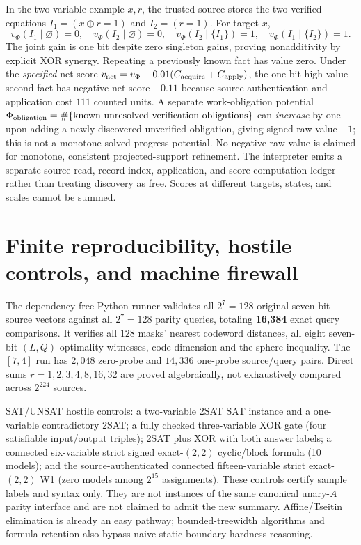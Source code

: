 \documentclass[10pt]{article}
\begin{document}
\noindent In the two-variable example $x,r$, the trusted source stores the two verified equations $I_1=(x\oplus r=1)$ and $I_2=(r=1)$. For target $x$,
\[
 v_\Phi(I_1\mid\varnothing)=0,\quad
 v_\Phi(I_2\mid\varnothing)=0,\quad
 v_\Phi(I_2\mid\{I_1\})=1,
 \quad v_\Phi(I_1\mid\{I_2\})=1.
\]
The joint gain is one bit despite zero singleton gains, proving nonadditivity by explicit XOR synergy. Repeating a previously known fact has value zero. Under the \emph{specified} net score $v_{\rm net}=v_\Phi-0.01(C_{\rm acquire}+C_{\rm apply})$, the one-bit high-value second fact has negative net score $-0.11$ because source authentication and application cost $111$ counted units. A separate work-obligation potential $\Phi_{\rm obligation}=\#\{\text{known unresolved verification obligations}\}$ can \emph{increase} by one upon adding a newly discovered unverified obligation, giving signed raw value $-1$; this is not a monotone solved-progress potential. No negative raw value is claimed for monotone, consistent projected-support refinement. The interpreter emits a separate source read, record-index, application, and score-computation ledger rather than treating discovery as free. Scores at different targets, states, and scales cannot be summed.

\section{Finite reproducibility, hostile controls, and machine firewall}
The dependency-free Python runner validates all $2^7=128$ original seven-bit source vectors against all $2^7=128$ parity queries, totaling \textbf{16,384} exact query comparisons. It verifies all $128$ masks' nearest codeword distances, all eight seven-bit $(L,Q)$ optimality witnesses, code dimension and the sphere inequality. The $[7,4]$ run has $2,048$ zero-probe and $14,336$ one-probe source/query pairs. Direct sums $r=1,2,3,4,8,16,32$ are proved algebraically, not exhaustively compared across $2^{224}$ sources.

\noindent SAT/UNSAT hostile controls: a two-variable 2SAT SAT instance and a one-variable contradictory 2SAT; a fully checked three-variable XOR gate (four satisfiable input/output triples); 2SAT plus XOR with both answer labels; a connected six-variable strict signed exact-$(2,2)$ cyclic/block formula (10 models); and the source-authenticated connected fifteen-variable strict exact-$(2,2)$ W1 (zero models among $2^{15}$ assignments). These controls certify sample labels and syntax only. They are not instances of the same canonical unary-$A$ parity interface and are not claimed to admit the new summary. Affine/Tseitin elimination is already an easy pathway; bounded-treewidth algorithms and formula retention also bypass naive static-boundary hardness reasoning.
\end{document}
